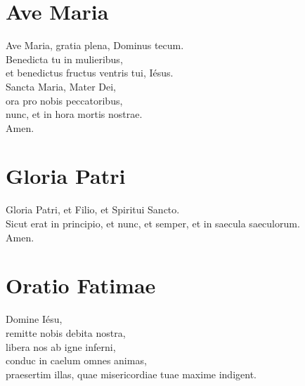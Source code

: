 \documentclass[paper=a5,pagesize=pdftex,fontsize=10pt,headinclude=on,twoside=off]{scrbook}
\begin{document}
\section{Ave Maria}
\begin{scripture}
  \begin{poetry}
    Ave Maria, gratia plena, Dominus tecum.\\
    Benedicta tu in mulieribus,\\
    et benedictus fructus ventris tui, Iésus.\\
    Sancta Maria, Mater Dei,\\
    ora pro nobis peccatoribus,\\
    nunc, et in hora mortis nostrae.\\
    Amen.\\
  \end{poetry}
\end{scripture}

\newpage
\section{Gloria Patri}
\begin{scripture}
  \begin{poetry}
    Gloria Patri, et Filio, et Spiritui Sancto.\\
    Sicut erat in principio, et nunc, et semper, et in saecula saeculorum.\\
    Amen.\\
  \end{poetry}
\end{scripture}

\vspace{37pt}
\section{Oratio Fatimae}
\begin{scripture}
  \begin{poetry}
    Domine Iésu,\\
    remitte nobis debita nostra,\\
    libera nos ab igne inferni,\\
    conduc in caelum omnes animas,\\
    praesertim illas, quae misericordiae tuae maxime indigent.\\
  \end{poetry}
\end{scripture}

\vspace{-3pt}
\end{document}
